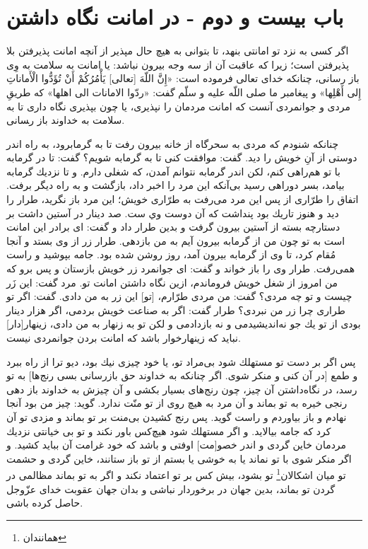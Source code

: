 \section*{باب بيست و دوم - 
در امانت نگاه داشتن}

اگر كسى به نزد تو امانتى بنهد، تا بتوانى به هيچ حال مپذير از آنچه امانت پذيرفتن بلا پذيرفتن است؛ زيرا كه عاقبت آن از سه وجه بيرون نباشد: يا امانت به سلامت به وِى باز رسانى، چنانكه خداى تعالى فرموده است: «إِنَّ اللّهَ [تعالى] يَأْمُرُكُمْ أَنْ تُؤَدُّوا الْأَماناتِ إِلی أَهْلِها» و پيغامبر ما صلى اللّه عليه و سلّم گفت: «ردّوا الامانات الى اهلها» كه طريقِ مردى و جوانمردى آنست كه امانت مردمان را نپذيرى، يا چون بپذيرى نگاه دارى تا به سلامت به خداوند باز ر‍سانى.

چنانكه شنودم كه مردى به سحرگاه از خانه بيرون رفت تا به گرمابرود، به راه اندر دوستى از آنِ خويش را ديد. گفت: موافقت كنى تا به گرمابه شويم‌؟ گفت: تا در گرمابه با تو هم‌راهى كنم، لكن اندر گرمابه نتوانم آمدن، كه شغلى دارم. و تا نزديك گرمابه بيامد، بسر دوراهى رسيد بى‌آنكه اين مرد را اخبر داد، بازگشت و به راه ديگر برفت. اتفاق را طرّارى از پس اين مرد مى‌رفت به طرّارى خويش؛ اين مرد باز نگريد، طرار را ديد و هنوز تاريك بود پنداشت كه آن دوست وي ست. صد دينار در آستين داشت بر دستارچه بسته از آستين بيرون گرفت و بدين طرار داد و گفت: اى برادر اين امانت است به تو چون من از گرمابه بيرون آيم به من بازدهى. طرار زر از وى بستد و آنجا مُقام كرد، تا وى از گرمابه بيرون آمد، روز روشن شده بود. جامه بپوشيد و راست همى‌رفت. طرار وى را باز خواند و گفت: اى جوانمرد زر خويش بازستان و پس برو كه من امروز از شغل خويش فروماندم، ازين نگاه داشتن امانت تو. مرد گفت: اين زَر چيست و تو چه مردى‌؟ گفت: من مردى طرّارم، [تو] اين زر به من دادى. گفت: اگر تو طرارى چرا زر من نبردى‌؟ طرار گفت: اگر به صناعت خويش بردمى، اگر هزار دينار بودى از تو يك جو نه‌انديشيدمى و نه بازدادمى و لكن تو به زنهار به من دادى، زينهار[دار] نبايد كه زينهارخوار باشد كه امانت بردن جوانمردى نيست.

پس اگر بر دست تو مستهلك شود بى‌مراد تو، يا خود چيزى نيك بود، ديو ترا از راه ببرد و طمع [در آن كنى و منكر شوى. اگر چنانكه به خداوند حق باز‌رسانى بسى رنج‌ها] به تو رسد، در نگاه‌داشتن آن چيز، چون رنج‌هاى بسيار بكشى و آن چيزش به خداوند باز دهى رنجى خيره به تو بماند و آن مرد به هيچ روى از تو منّت ندارد. گويد: چيز من بود آنجا نهادم و باز بياوردم و راست گويد. پس رنج كشيدن بى‌منت بر تو بماند و مزدى تو آن كرد كه جامه بيالايد. و اگر مستهلك شود هيچ‌كس باور نكند و تو بى خيانتى نزديك مردمان خاين گردى و اندر خصو[مت] اوفتى و باشد كه خود غرامت آن ببايد كشيد. و اگر منكر شوى با تو نماند يا به خوشى يا بستم از تو باز ستانند، خاين گردى و حشمت تو ميان اشكالان\footnote{همانندان} تو بشود، بيش كس بر تو اعتماد نكند و اگر به تو بماند مظالمى در گردن تو بماند، بدين جهان در برخوردار نباشى و بدان جهان عقوبت خداى عزّوجل حاصل كرده باشى.

